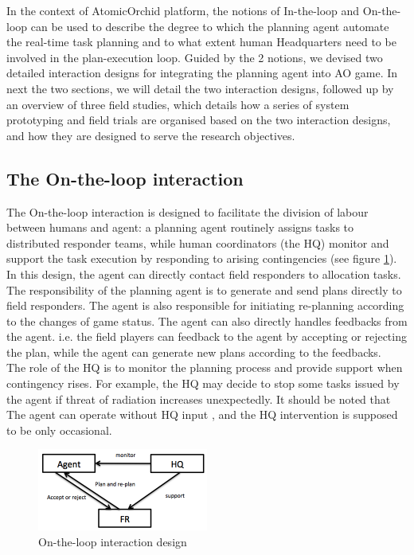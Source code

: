 In the context of AtomicOrchid platform, the notions of In-the-loop and On-the-loop can be used to describe the degree to which the planning agent automate the real-time task planning and to what extent human Headquarters need to be involved in the plan-execution loop. Guided by the 2 notions, we devised two detailed interaction designs for integrating the planning agent into AO game. In next the two sections, we will detail the two interaction designs, followed up by an overview of three field studies, which details how a series of system prototyping  and field trials are organised based on the two interaction designs, and how they are designed to serve the research objectives.\\

\subsection{The On-the-loop interaction}
The On-the-loop interaction is designed to facilitate the division of labour between humans and agent: a planning agent routinely assigns tasks to distributed responder teams, while human coordinators (the HQ) monitor and support the task execution by responding to arising contingencies (see figure \ref{fig:OnTheLoop}). In this design, the agent can directly contact field responders to allocation tasks. The responsibility of the planning agent is to generate and send plans directly to field responders. The agent is also responsible for initiating re-planning according to the changes of game status. The agent can also directly handles feedbacks from the agent. i.e. the field players can feedback to the agent by accepting or rejecting the plan, while the agent can generate new plans according to the feedbacks. \\

The role of the HQ is to monitor the planning process and provide support when contingency rises. For example, the HQ may decide to stop some tasks issued by the agent if threat of radiation increases unexpectedly. It should be noted that The agent can operate without HQ input , and the HQ intervention is supposed to be only occasional. \\

\begin{figure}[h]
  \centering
  \includegraphics[width=0.5\textwidth]{img/approach/OnTheLoop}
  \caption{On-the-loop interaction design}
  \label{fig:OnTheLoop}
\end{figure}

